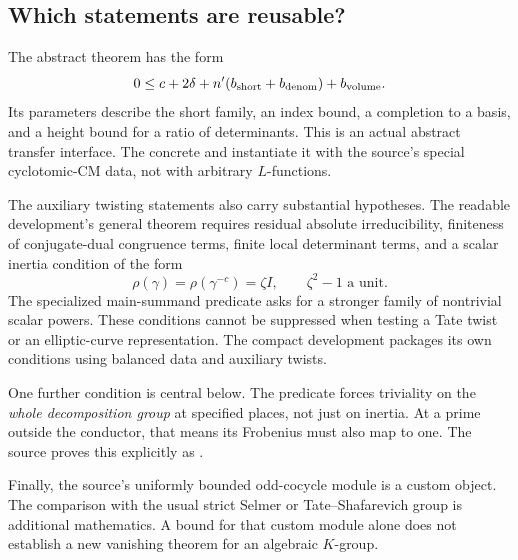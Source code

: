 \subsection{Which statements are reusable?}

The abstract theorem  has the form
\begin{equation}\label{eq:covolume-source}
 0\le c+2\delta+n'(b_{\rm short}+b_{\rm denom})+b_{\rm volume}.
\end{equation}
Its parameters describe the short family, an index bound, a completion to a basis, and a height bound for a ratio of determinants. This is an actual abstract transfer interface. The concrete  and  instantiate it with the source's special cyclotomic-CM data, not with arbitrary $L$-functions.\cite{covolume_source}

The auxiliary twisting statements also carry substantial hypotheses. The readable development's general theorem requires residual absolute irreducibility, finiteness of conjugate-dual congruence terms, finite local determinant terms, and a scalar inertia condition of the form
\[
 \rho(\gamma)=\rho(\gamma^{-c})=\zeta I,
 \qquad \zeta^2-1\text{ a unit}.
\]
The specialized main-summand predicate asks for a stronger family of nontrivial scalar powers. These conditions cannot be suppressed when testing a Tate twist or an elliptic-curve representation. The compact development packages its own conditions using balanced data and auxiliary twists.\cite{selmer_source}

One further condition is central below. The predicate  forces triviality on the \emph{whole decomposition group} at specified places, not just on inertia. At a prime outside the conductor, that means its Frobenius must also map to one. The source proves this explicitly as .\cite{decomp_source}

Finally, the source's uniformly bounded odd-cocycle module is a custom object. The comparison with the usual strict Selmer or Tate--Shafarevich group is additional mathematics. A bound for that custom module alone does not establish a new vanishing theorem for an algebraic $K$-group.\cite{odd_source}
